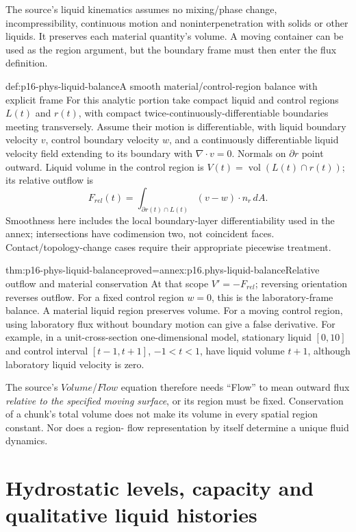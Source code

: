 The source's liquid kinematics assumes no mixing/phase change,
incompressibility, continuous motion and noninterpenetration with solids
or other liquids. It preserves each material quantity's volume. A moving
container can be used as the region argument, but the boundary frame must
then enter the flux definition.

\begin{hbdefinition}{def:p16-phys-liquid-balance}{A smooth material/control-region balance with explicit frame}
For this analytic portion take compact liquid and control regions \(L(t)\)
and \(r(t)\), with compact twice-continuously-differentiable boundaries
meeting transversely. Assume their
motion is differentiable, with liquid boundary velocity \(v\), control
boundary velocity \(w\), and a continuously differentiable liquid velocity
field extending to its boundary with \(\nabla\cdot v=0\).
Normals on \(\partial r\) point outward. Liquid volume in the control
region is \(V(t)=\operatorname{vol}(L(t)\cap r(t))\); its relative
outflow is
\[
 F_{rel}(t)=\int_{\partial r(t)\cap L(t)}(v-w)\cdot n_r\,dA.
\]
Smoothness here includes the local boundary-layer differentiability used
in the annex; intersections have codimension two, not coincident faces.
Contact/topology-change cases require their appropriate piecewise treatment.
\end{hbdefinition}

\begin{hbtheorem}{thm:p16-phys-liquid-balance}{proved=annex:p16.phys-liquid-balance}{Relative outflow and material conservation}
At that scope \(V'=-F_{rel}\); reversing orientation reverses outflow.
For a fixed control region \(w=0\), this is the laboratory-frame balance.
A material liquid region preserves volume. For a moving control region,
using laboratory flux without boundary motion can give a false derivative.
For example, in a unit-cross-section one-dimensional model, stationary
liquid \([0,10]\) and control interval \([t-1,t+1]\), \(-1<t<1\),
have liquid volume \(t+1\), although laboratory liquid velocity is zero.
\end{hbtheorem}

The source's \(Volume\)/\(Flow\) equation therefore needs ``Flow''
to mean outward flux \emph{relative to the specified moving surface},
or its region must be fixed. Conservation of a chunk's total volume does
not make its volume in every spatial region constant. Nor does a region-
flow representation by itself determine a unique fluid dynamics.

\section{Hydrostatic levels, capacity and qualitative liquid histories}
\label{sec:p16-phys-liquid-statics}

